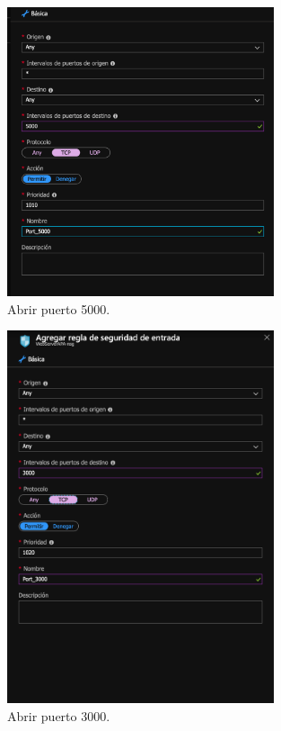 \documentclass[english,runningheads,a4paper]{llncs}[2018/03/10]
\begin{document}
\begin{figure}[h!]
 \centering
 \includegraphics[width=0.7\textwidth]{./Web/Azure/Azure2.png}
 \caption{Abrir puerto 5000.}
\end{figure}

\begin{figure}[h!]
 \centering
 \includegraphics[width=0.7\textwidth]{./Web/Azure/Azure3.png}
 \caption{Abrir puerto 3000.}
\end{figure}
\end{document}
